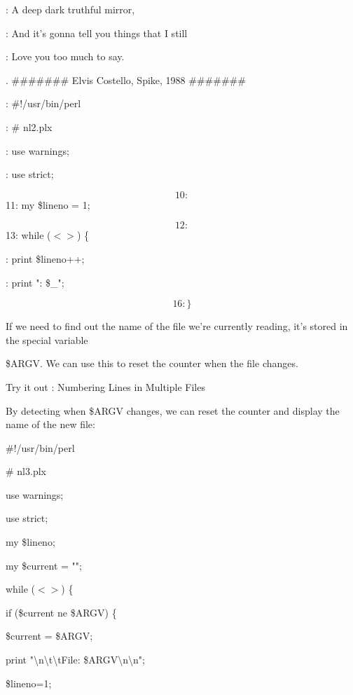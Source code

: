 \documentclass[a4paper,11pt]{book}
\begin{document}
: A deep dark truthful mirror,

: And it's gonna tell you things that I still

: Love you too much to say.

. \#\#\#\#\#\#\# Elvis Costello, Spike, 1988 \#\#\#\#\#\#\#

: \#!/usr/bin/perl

: \# nl2.plx

: use warnings;

: use strict;

\[10:\] 
11: my \$lineno = 1;

\[12:\] 
13: while ($<$$>$) \{

: print \$lineno++;

: print ": \$\_";

\[16: \}\] 


\noindent If we need to find out the name of the file we're currently reading, it's stored in the special variable

\noindent \$ARGV. We can use this to reset the counter when the file changes.

\noindent 

\noindent 

\noindent Try it out : Numbering Lines in Multiple Files

\noindent 

\noindent By detecting when \$ARGV changes, we can reset the counter and display the name of the new file:

\noindent 

\noindent \#!/usr/bin/perl

\noindent \# nl3.plx

\noindent use warnings;

\noindent use strict;

\noindent 

\noindent my \$lineno;

\noindent my \$current = "";

\noindent 

\noindent while ($<$$>$) \{

\noindent if (\$current ne \$ARGV) \{

\noindent \$current = \$ARGV;

\noindent print "\textbackslash n\textbackslash t\textbackslash tFile: \$ARGV\textbackslash n\textbackslash n";

\noindent \$lineno=1;
\end{document}
